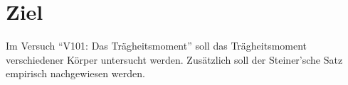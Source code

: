 \section{Ziel}
\label{sec:Ziel}

Im Versuch \enquote{V101: Das Trägheitsmoment} soll das Trägheitsmoment verschiedener Körper untersucht werden.
Zusätzlich soll der Steiner'sche Satz empirisch nachgewiesen werden.